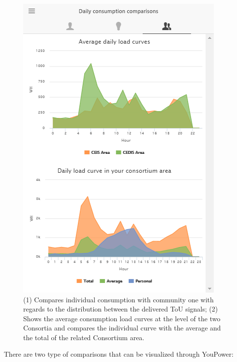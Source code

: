 \begin{figure}[htb]
\begin{center}
\begin{minipage}[htb]{0.45\linewidth}
         \includegraphics[width=1\linewidth]{img/benchmark.png}
        \end{minipage}
      \end{center}
      \caption{(1) Compares individual consumption with community one with regards to the distribution between the delivered ToU signals; (2) Shows the average consumption load curves at the level of the two Consortia and compares the individual curve with the average and the total of the related Consortium area.
}
\label{fig:comparison}
\end{figure}
There are two type of comparisons that can be visualized through YouPower:
